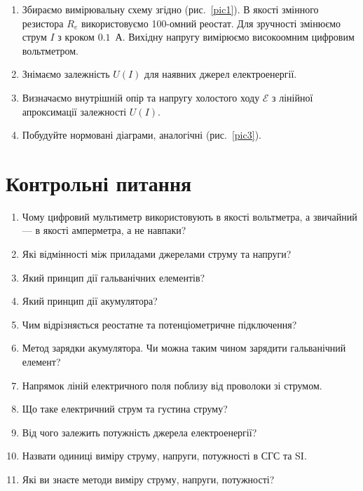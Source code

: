\documentclass{LabWork}
\begin{document}
\begin{enumerate}
	\item Збираємо вимірювальну схему згідно (рис.~\ref{pic1}). В якості змінного резистора $R_e$ використовуємо 100-омний реостат. Для зручності змінюємо струм $I$ з кроком $0.1$~А. Вихідну напругу вимірюємо високоомним цифровим вольтметром.
	\item Знімаємо залежність $U(I)$ для наявних джерел електроенергії.
	\item Визначаємо внутрішній опір та напругу холостого ходу $\mathcal{E}$  з лінійної апроксимації залежності $U(I)$.
	\item Побудуйте нормовані діаграми, аналогічні (рис.~\ref{pic3}).
\end{enumerate}



\section*{Контрольні питання}

\begin{enumerate}
	\item Чому цифровий мультиметр використовують в якості вольтметра, а звичайний --- в якості амперметра, а не навпаки?
	\item Які відмінності між приладами джерелами струму та напруги?
	\item Який принцип дії гальванічних елементів?
	\item Який принцип дії акумулятора?
	\item Чим відрізняється реостатне та потенціометричне підключення?
	\item Метод зарядки акумулятора. Чи можна таким чином зарядити гальванічний елемент?
	\item Напрямок ліній електричного поля поблизу від проволоки зі струмом.
	\item Що таке електричний струм та густина струму?
	\item Від чого залежить потужність джерела електроенергії?
	\item Назвати одиниці виміру струму, напруги, потужності в СГС та SI.
	\item Які ви знаєте методи виміру струму, напруги, потужності?
\end{enumerate}
\end{document}
